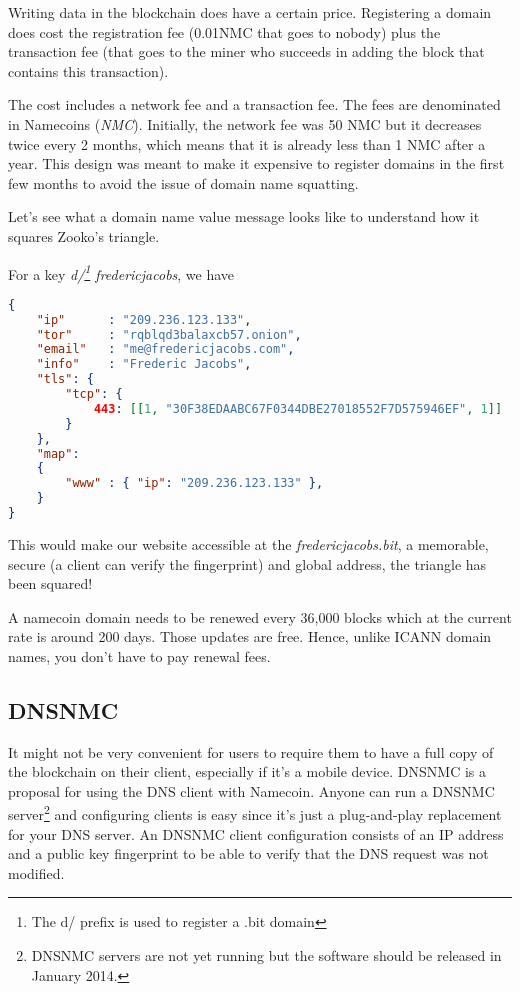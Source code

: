 \documentclass{vldb}
\begin{document}
Writing data in the blockchain does have a certain price. Registering a domain does cost the registration fee (0.01NMC that goes to nobody) plus the transaction fee (that goes to the miner who succeeds in adding the block that contains this transaction).

The cost includes a network fee and a transaction fee. The fees are denominated in Namecoins (\emph{NMC}). Initially, the network fee was 50 NMC but it decreases twice every 2 months, which means that it is already less than 1 NMC after a year. This design was meant to make it expensive to register domains in the first few months to avoid the issue of domain name squatting.

Let's see what a domain name value message looks like to understand how it squares Zooko's triangle.

For a key \emph{d/\footnote{The d/ prefix is used to register a .bit domain} fredericjacobs}, we have 

\begin{lstlisting}[language=json,firstnumber=1]
{
    "ip"      : "209.236.123.133",
    "tor"     : "rqblqd3balaxcb57.onion",
    "email"   : "me@fredericjacobs.com",
    "info"    : "Frederic Jacobs",
    "tls": {
        "tcp": {
            443: [[1, "30F38EDAABC67F0344DBE27018552F7D575946EF", 1]]
        }
    },
    "map":
    {
        "www" : { "ip": "209.236.123.133" },
    }
}
\end{lstlisting}

This would make our website accessible at the \emph{fredericjacobs.bit}, a memorable, secure (a client can verify the fingerprint) and global address, the triangle has been squared!

A namecoin domain needs to be renewed every 36,000 blocks which at the current rate is around 200 days. Those updates are free. Hence, unlike ICANN domain names, you don't have to pay renewal fees.

\subsection{DNSNMC}

It might not be very convenient for users to require them to have a full copy of the blockchain on their client, especially if it's a mobile device. DNSNMC\cite{okTurtles} is a proposal for using the DNS client with Namecoin. Anyone can run a DNSNMC server\footnote{DNSNMC servers are not yet running but the software should be released in January 2014.} and configuring clients is easy since it's just a plug-and-play replacement for your DNS server. An DNSNMC client configuration consists of an IP address and a public key fingerprint to be able to verify that the DNS request was not modified. 
\end{document}
